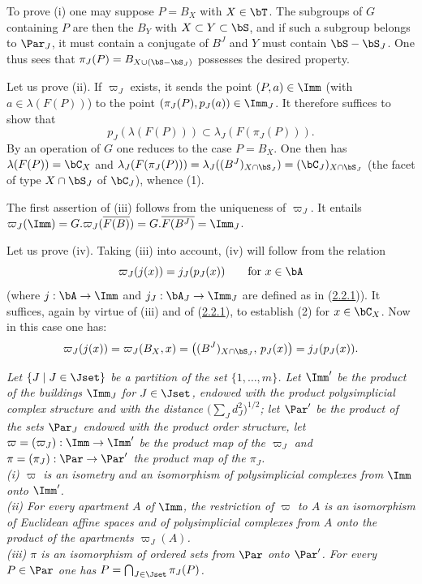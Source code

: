 \documentclass[12pt,a4paper,oneside,english]{smfart}
\makeatletter
\newcommand{\btanchor}[1]{\leavevmode\Hy@raisedlink{\hypertarget{bt:#1}{}}}
\newcommand{\btpageanchor}[1]{\Hy@raisedlink{\hypertarget{p:#1}{}}}
\newcommand{\btref}[1]{\hyperlink{bt:#1}{#1}}
\newcommand{\btpage}[1]{\marginnote{p.~#1}\btpageanchor{#1}}
\newcommand{\pagemark}[1]{\btpage{#1}}
\theoremstyle{definition}
\theoremstyle{bt}
\makeatother
\begin{document}
\medskip
To prove (i) one may suppose $P=B_X$ with $X\in\bT$. The subgroups of $G$
containing $P$ are then the $B_Y$ with $X\subset Y\subset\bS$, and if such a
subgroup belongs to $\Par_J$,
\pagemark{48}
it must contain a conjugate of $B^J$ and $Y$ must contain $\bS-\bS_J$. One
thus sees that $\pi_J(P)=B_{X\cup(\bS-\bS_J)}$ possesses the desired property.

Let us prove (ii). If $\varpi_J$ exists, it sends the point $(P,a)\in\Imm$
(with $a\in\lambda(F(P))$) to the point $(\pi_J(P),p_J(a))\in\Imm_J$. It
therefore suffices to show that
\begin{equation}
p_J(\lambda(F(P)))\subset \lambda_J(F(\pi_J(P))).
\end{equation}
By an operation of $G$ one reduces to the case $P=B_X$. One then has
$\lambda(F(P))=\bC_X$ and
$\lambda_J(F(\pi_J(P)))=\lambda_J((B^J)_{X\cap\bS_J})=(\bC_J)_{X\cap\bS_J}$
(the facet of type $X\cap\bS_J$ of $\bC_J$), whence (1).

The first assertion of (iii) follows from the uniqueness of $\varpi_J$. It
entails
$\varpi_J(\Imm)=G.\varpi_J(\overline{F(B)})=G.\overline{F(B^J)}=\Imm_J$.

Let us prove (iv). Taking (iii) into account, (iv) will follow from the
relation
\begin{equation}
\varpi_J(j(x))=j_J(p_J(x))\qquad\text{for }x\in\bA
\end{equation}
(where $j:\bA\to\Imm$ and $j_J:\bA_J\to\Imm_J$ are defined as in (\btref{2.2.1})). It
suffices, again by virtue of (iii) and of (\btref{2.2.1}), to establish (2) for
$x\in\bC_X$. Now in this case one has:
\[
\varpi_J(j(x))=\varpi_J(B_X,x)=\bigl((B^J)_{X\cap\bS_J},\,p_J(x)\bigr)=j_J(p_J(x)).
\]

\btanchor{2.6.4}
\emph{Let $\{J\mid J\in\Jset\}$ be a partition of the set $\{1,\dots,m\}$. Let
$\Imm'$ be the product of the buildings $\Imm_J$ for $J\in\Jset$, endowed with
the product polysimplicial complex structure and with the distance
$\bigl(\sum_J d_J^2\bigr)^{1/2}$; let $\Par'$ be the product of the sets
$\Par_J$ endowed with the product order structure, let
$\varpi=(\varpi_J):\Imm\to\Imm'$ be the product map of the $\varpi_J$ and
$\pi=(\pi_J):\Par\to\Par'$ the product map of the $\pi_J$.\\
(i) $\varpi$ is an isometry and an isomorphism of polysimplicial complexes
from $\Imm$ onto $\Imm'$.\\
(ii) For every apartment $A$ of $\Imm$, the restriction of $\varpi$ to $A$ is
an isomorphism of Euclidean affine spaces and of polysimplicial complexes from
$A$ onto the product of the apartments $\varpi_J(A)$.\\
(iii) $\pi$ is an isomorphism of ordered sets from $\Par$ onto $\Par'$. For
every $P\in\Par$ one has $P=\bigcap_{J\in\Jset}\pi_J(P)$.}
\end{document}
